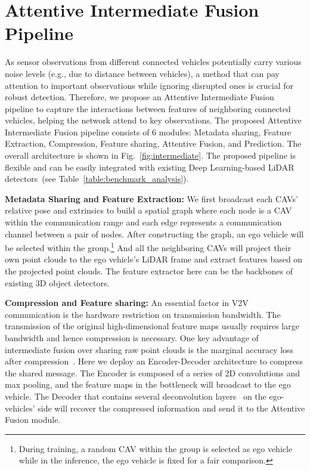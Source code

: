 \documentclass[letterpaper, 10 pt, conference]{ieeeconf}  %
\begin{document}
\section{Attentive Intermediate Fusion Pipeline}
As sensor observations from different connected vehicles potentially carry various noise levels (e.g., due to distance between vehicles), a method that can pay attention to important observations while ignoring disrupted ones is crucial for robust detection. Therefore, we propose an Attentive Intermediate Fusion pipeline to capture the interactions between features of neighboring connected vehicles, helping the network attend to key observations. The proposed Attentive Intermediate Fusion pipeline consists of 6 modules: Metadata sharing, Feature Extraction, Compression, Feature sharing, Attentive Fusion, and Prediction. The overall architecture is shown in Fig.~\ref{fig:intermediate}. The proposed pipeline is flexible and can be easily integrated with existing Deep Learning-based LiDAR detectors~(see Table~\ref{table:benchmark_analysis}). 


\noindent\textbf{Metadata Sharing and Feature Extraction: }We first broadcast each CAVs' relative pose and extrinsics to build a spatial graph where each node is a CAV within the communication range and each edge represents a communication channel between a pair of nodes. After constructing the graph, an ego vehicle will be selected within the group.\footnote{During training, a random CAV within the group is selected as ego vehicle while in the inference, the ego vehicle is fixed for a fair comparison.} And all the neighboring  CAVs will project their own point clouds to the ego vehicle's LiDAR frame and extract features based on the projected point clouds. The feature extractor here can be the backbones of existing 3D object detectors.

\noindent\textbf{Compression and Feature sharing: }An essential factor in V2V communication is the hardware restriction on transmission bandwidth. The transmission of the original high-dimensional feature maps usually requires large bandwidth and hence compression is necessary.  One key advantage of intermediate fusion over sharing raw point clouds is the marginal accuracy loss after compression~\cite{Wang2020V2VNetVC}. Here we deploy an Encoder-Decoder architecture to compress the shared message. The Encoder is composed of a series of 2D convolutions and max pooling, and the feature maps in the bottleneck will broadcast to the ego vehicle. The Decoder that contains several deconvolution layers~\cite{noh2015learning} on the ego-vehicles' side will recover the compressed information and send it to the Attentive Fusion module. 
\end{document}
